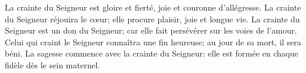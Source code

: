 La crainte du Seigneur est gloire et fierté, joie et couronne d’allégresse.
La crainte du Seigneur réjouira le cœur;
	elle procure plaisir, joie et longue vie.
La crainte du Seigneur est un don du Seigneur;
	car elle fait persévérer sur les voies de l’amour.
Celui qui craint le Seigneur connaîtra une fin heureuse;
	au jour de sa mort, il sera béni.
La sagesse commence avec la crainte du Seigneur:
	elle est formée en chaque fidèle dès le sein maternel.
